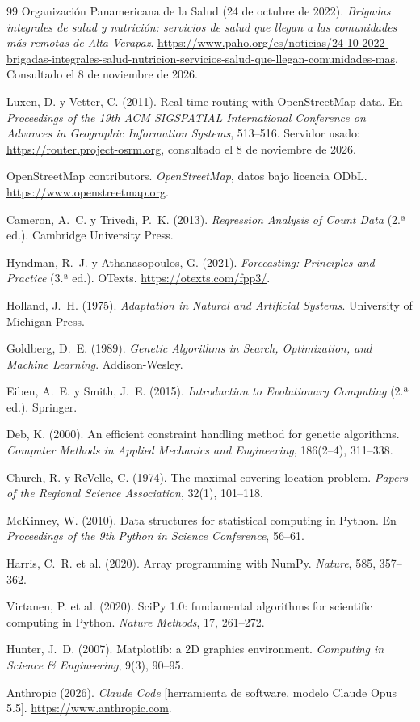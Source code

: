 \documentclass[11pt,letterpaper]{article}
\begin{document}
\begin{thebibliography}{99}
 Organización Panamericana de la Salud (24 de octubre de 2022). \emph{Brigadas integrales de salud y nutrición: servicios de salud que llegan a las comunidades más remotas de Alta Verapaz}. \url{https://www.paho.org/es/noticias/24-10-2022-brigadas-integrales-salud-nutricion-servicios-salud-que-llegan-comunidades-mas}. Consultado el 8 de noviembre de 2026.

 Luxen, D. y Vetter, C. (2011). Real-time routing with OpenStreetMap data. En \emph{Proceedings of the 19th ACM SIGSPATIAL International Conference on Advances in Geographic Information Systems}, 513--516. Servidor usado: \url{https://router.project-osrm.org}, consultado el 8 de noviembre de 2026.

 OpenStreetMap contributors. \emph{OpenStreetMap}, datos bajo licencia ODbL. \url{https://www.openstreetmap.org}.

 Cameron, A.~C. y Trivedi, P.~K. (2013). \emph{Regression Analysis of Count Data} (2.ª ed.). Cambridge University Press.

 Hyndman, R.~J. y Athanasopoulos, G. (2021). \emph{Forecasting: Principles and Practice} (3.ª ed.). OTexts. \url{https://otexts.com/fpp3/}.

 Holland, J.~H. (1975). \emph{Adaptation in Natural and Artificial Systems}. University of Michigan Press.

 Goldberg, D.~E. (1989). \emph{Genetic Algorithms in Search, Optimization, and Machine Learning}. Addison-Wesley.

 Eiben, A.~E. y Smith, J.~E. (2015). \emph{Introduction to Evolutionary Computing} (2.ª ed.). Springer.

 Deb, K. (2000). An efficient constraint handling method for genetic algorithms. \emph{Computer Methods in Applied Mechanics and Engineering}, 186(2--4), 311--338.

 Church, R. y ReVelle, C. (1974). The maximal covering location problem. \emph{Papers of the Regional Science Association}, 32(1), 101--118.

 McKinney, W. (2010). Data structures for statistical computing in Python. En \emph{Proceedings of the 9th Python in Science Conference}, 56--61.

 Harris, C.~R. et al. (2020). Array programming with NumPy. \emph{Nature}, 585, 357--362.

 Virtanen, P. et al. (2020). SciPy 1.0: fundamental algorithms for scientific computing in Python. \emph{Nature Methods}, 17, 261--272.

 Hunter, J.~D. (2007). Matplotlib: a 2D graphics environment. \emph{Computing in Science \& Engineering}, 9(3), 90--95.

 Anthropic (2026). \emph{Claude Code} [herramienta de software, modelo Claude Opus 5.5]. \url{https://www.anthropic.com}.

\end{thebibliography}
\end{document}
